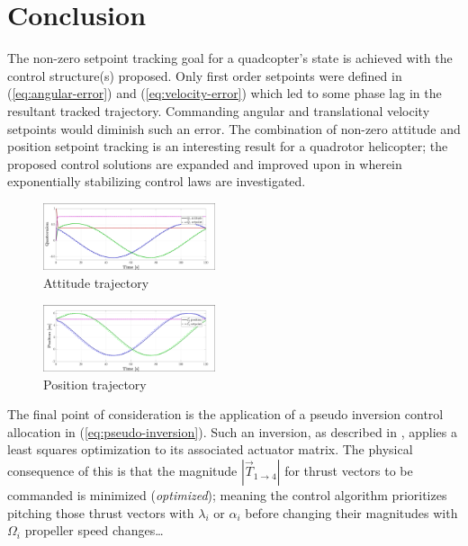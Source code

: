 \documentclass[a4paper, 10pt, conference]{ieeeconf}
\begin{document}
\section{Conclusion}
\label{sec:conclusion}
The non-zero setpoint tracking goal for a quadcopter's state is achieved with the control structure(s) proposed. Only first order setpoints were defined in (\ref{eq:angular-error}) and (\ref{eq:velocity-error}) which led to some phase lag in the resultant tracked trajectory. Commanding angular and translational velocity setpoints would diminish such an error. The combination of non-zero attitude and position setpoint tracking is an interesting result for a quadrotor helicopter; the proposed control solutions are expanded and improved upon in \cite{dualaxistilting} wherein exponentially stabilizing control laws are investigated.
\par
\begin{figure}[btp]
\vspace{-12pt}
\centering
\includegraphics[width=0.45\textwidth]{figs/attitude-trajectory}
\vspace{-8pt}
\caption{Attitude trajectory}
\label{fig:attitude-trajectory}
\end{figure}
\begin{figure}[tbp]
\vspace{-10pt}
\centering
\includegraphics[width=0.45\textwidth]{figs/position-trajectory}
\vspace{-8pt}
\caption{Position trajectory}
\label{fig:position-trajectory}
\end{figure}
\par
The final point of consideration is the application of a pseudo inversion control allocation in (\ref{eq:pseudo-inversion}). Such an inversion, as described in \cite{allocation}, applies a least squares optimization to its associated actuator matrix. The physical consequence of this is that the magnitude $|\vec{T}_{1\rightarrow 4}|$ for thrust vectors to be commanded is minimized (\emph{optimized}); meaning the control algorithm prioritizes pitching those thrust vectors with $\lambda_i$ or $\alpha_i$ before changing their magnitudes with $\Omega_i$ propeller speed changes\ldots
\end{document}
